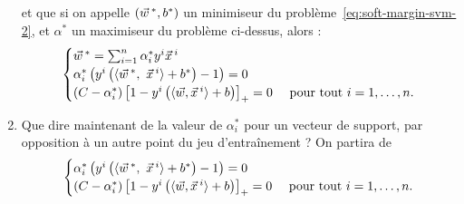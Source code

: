 \documentclass[french,11pt]{article}
\begin{document}
\begin{enumerate}
  et que si on appelle $(\ww^*, b^*)$ un minimiseur du
  problème~\eqref{eq:soft-margin-svm-2}, et $\alpha^*$ un maximiseur du
  problème ci-dessus, alors :
  \begin{equation*}
    \begin{cases}
      \ww^* = \sum_{i=1}^n \alpha_i^* y^i \xx^i & \\
      \alpha_i^* \left(y^i \left(\innerproduct{\ww^*,~\xx^i} + b^*\right) - 1 \right) = 0 & \\
      (C-\alpha^*_i) \left[ 1 - y^i \left( \langle \ww, \xx^i \rangle + b
      \right)\right]_+ = 0 & \text{ pour tout } i=1, \dots, n.
    \end{cases}
  \end{equation*}
\item Que dire maintenant de la valeur de $\alpha_i^*$ pour un vecteur de support, par opposition à un autre point du jeu d'entraînement ? On partira de 
  \begin{equation*}
    \begin{cases}
      \alpha_i^* \left(y^i \left(\innerproduct{\ww^*,~\xx^i} + b^*\right) - 1 \right) = 0 & \\
      (C-\alpha^*_i) \left[ 1 - y^i \left( \langle \ww, \xx^i \rangle + b
      \right)\right]_+ = 0 & \text{ pour tout } i=1, \dots, n.
    \end{cases}
  \end{equation*}
\end{enumerate}
\end{document}
